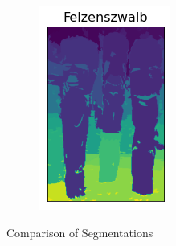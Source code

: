 \documentclass[12pt]{extarticle}
\begin{document}
\begin{figure}[!h]
\begin{subfigure}[b]{0.19\textwidth}
        \includegraphics[width=\textwidth]{felzenszwalb_compared.png}
        \caption{}
        \label{fig:f5}
      \end{subfigure}
      \caption{Comparison of Segmentations}
    \end{figure}
\end{document}
